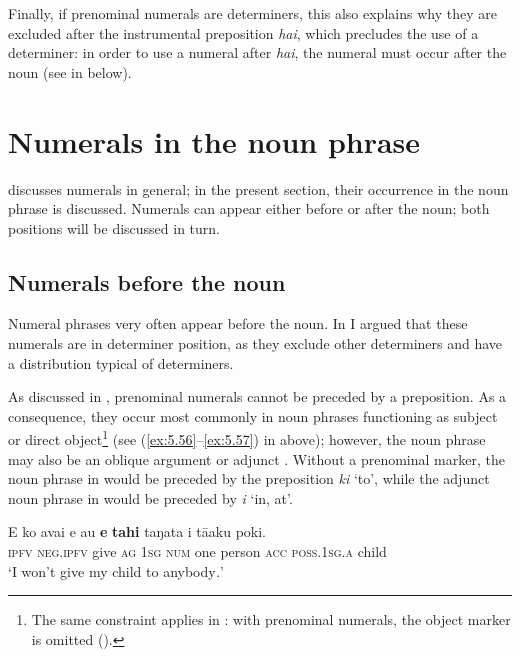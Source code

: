 Finally, if prenominal numerals are determiners, this also explains why they are excluded after the instrumental preposition \textit{hai}, which precludes the use of a determiner: in order to use a numeral after \textit{hai}, the numeral must occur after the noun (see  in  below).
\section{Numerals in the noun phrase}\label{sec:5.4}

 discusses numerals in general; in the present section, their occurrence in the noun phrase is discussed. Numerals can appear either before or after the noun; both positions will be discussed in turn.

\subsection{Numerals before the noun}\label{sec:5.4.1}

Numeral phrases very often appear before the noun. In  I argued that these numerals are in determiner position, as they exclude other determiners and have a distribution typical of determiners.

As discussed in , prenominal numerals cannot be preceded by a preposition. As a consequence, they occur most commonly in noun phrases functioning as subject or direct object\footnote{\label{fn:258}The same constraint applies in : with prenominal numerals, the object marker is omitted (\citealt[184]{LazardPeltzer2000}).} (see (\ref{ex:5.56}–\ref{ex:5.57}) in  above); however, the noun phrase may also be an oblique argument  or adjunct . Without a prenominal marker, the noun phrase in  would be preceded by the preposition \textit{ki} ‘to’, while the adjunct noun phrase in  would be preceded by \textit{{\ꞌ}i} ‘in, at’.

\ea\label{ex:5.61}
\gll E ko {\ꞌ}avai e au \textbf{e} \textbf{tahi} taŋata i tā{\ꞌ}aku poki. \\
\textsc{ipfv} \textsc{neg.ipfv} give \textsc{ag} \textsc{1sg} \textsc{num} one person \textsc{acc} \textsc{poss.1sg.a} child \\

\glt 
‘I won’t give my child to anybody\textit{.}’ \textstyleExampleref{[R229.069]} 
\z

